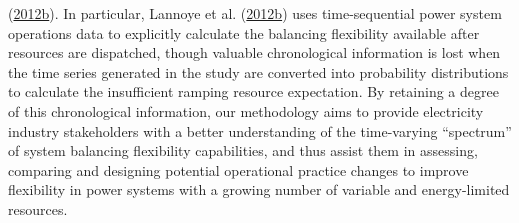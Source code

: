 \documentclass[12pt,a4paper,]{report}
\begin{document}
(\protect\hyperlink{ref-lannoyeEvaluationPowerSystem2012}{2012b}). In
particular, Lannoye et al.
(\protect\hyperlink{ref-lannoyeEvaluationPowerSystem2012}{2012b}) uses
time-sequential power system operations data to explicitly calculate the
balancing flexibility available after resources are dispatched, though
valuable chronological information is lost when the time series
generated in the study are converted into probability distributions to
calculate the insufficient ramping resource expectation. By retaining a
degree of this chronological information, our methodology aims to
provide electricity industry stakeholders with a better understanding of
the time-varying ``spectrum'' of system balancing flexibility
capabilities, and thus assist them in assessing, comparing and designing
potential operational practice changes to improve flexibility in power
systems with a growing number of variable and energy-limited resources.
\end{document}
